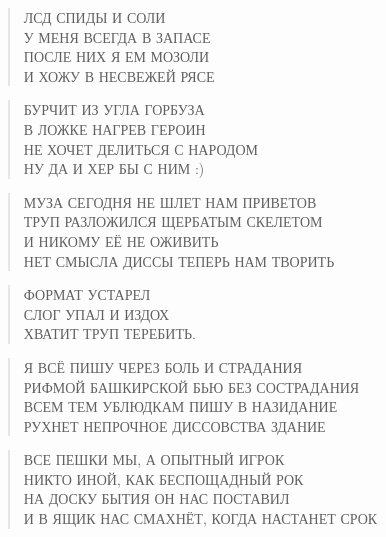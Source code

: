 \poemtitle{***}
\begin{verse}
ЛСД СПИДЫ И СОЛИ\\
У МЕНЯ ВСЕГДА В ЗАПАСЕ\\
ПОСЛЕ НИХ Я ЕМ МОЗОЛИ\\
И ХОЖУ В НЕСВЕЖЕЙ РЯСЕ
\end{verse}

\poemtitle{***}
\begin{verse}
БУРЧИТ ИЗ УГЛА ГОРБУЗА\\
В ЛОЖКЕ НАГРЕВ ГЕРОИН\\
НЕ ХОЧЕТ ДЕЛИТЬСЯ С НАРОДОМ\\
НУ ДА И ХЕР БЫ С НИМ :)
\end{verse}

\poemtitle{***}
\begin{verse}
МУЗА СЕГОДНЯ НЕ ШЛЕТ НАМ ПРИВЕТОВ\\
ТРУП РАЗЛОЖИЛСЯ ЩЕРБАТЫМ СКЕЛЕТОМ\\
И НИКОМУ ЕЁ НЕ ОЖИВИТЬ\\
НЕТ СМЫСЛА ДИССЫ ТЕПЕРЬ НАМ ТВОРИТЬ
\end{verse}

\poemtitle{***}
\begin{verse}
ФОРМАТ УСТАРЕЛ\\
СЛОГ УПАЛ И ИЗДОХ\\
ХВАТИТ ТРУП ТЕРЕБИТЬ.
\end{verse}

\poemtitle{***}
\begin{verse}
Я ВСЁ ПИШУ ЧЕРЕЗ БОЛЬ И СТРАДАНИЯ\\
РИФМОЙ БАШКИРСКОЙ БЬЮ БЕЗ СОСТРАДАНИЯ\\
ВСЕМ ТЕМ УБЛЮДКАМ ПИШУ В НАЗИДАНИЕ\\
РУХНЕТ НЕПРОЧНОЕ ДИССОВСТВА ЗДАНИЕ
\end{verse}

\poemtitle{***}
\begin{verse}
ВСЕ ПЕШКИ МЫ, А ОПЫТНЫЙ ИГРОК\\
НИКТО ИНОЙ, КАК БЕСПОЩАДНЫЙ РОК\\
НА ДОСКУ БЫТИЯ ОН НАС ПОСТАВИЛ\\
И В ЯЩИК НАС СМАХНЁТ, КОГДА НАСТАНЕТ СРОК
\end{verse}

